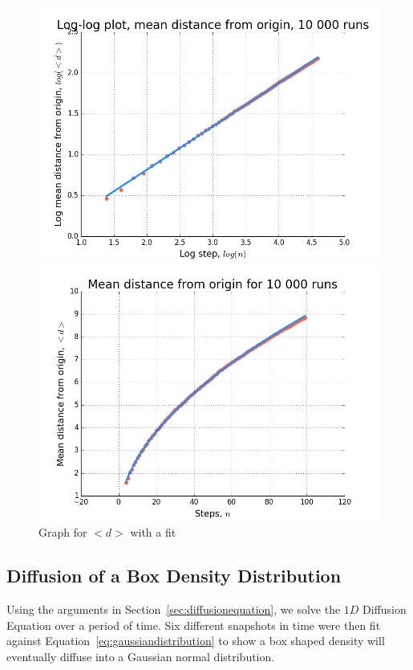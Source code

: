 \documentclass[12pt]{article}
\begin{document}
\begin{figure}[!htb]
  \includegraphics[width=\linewidth]{meanDLog.png}
  \caption{$log(<d>)\,vs\,log(n)$}\label{fig:meanDLog}
\endminipage\hfill
{}
  \includegraphics[width=\linewidth]{meanD.png}
  \caption{Graph for $<d>$ with a fit}\label{fig:meanD}
\endminipage\hfill
\end{figure}


\subsection{Diffusion of a Box Density Distribution}
\label{sec:diffusion-boxdensity}
Using the arguments in Section~\ref{sec:diffusionequation}, we solve the $1D$ Diffusion Equation over a period of time. Six different snapshots in time were then fit against Equation~\ref{eq:gaussiandistribution} to show a box shaped density will eventually diffuse into a Gaussian normal distribution.
\end{document}
